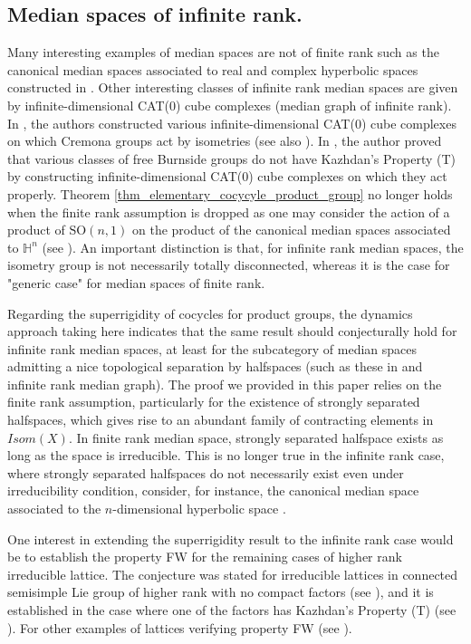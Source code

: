 \documentclass{amsart}
\numberwithin{equation}{section}
\theoremstyle{definition}
\begin{document}
\color{black}
\subsection{Median spaces of infinite rank.}
Many interesting examples of median spaces are not of finite rank such as the canonical median spaces associated to real and complex hyperbolic spaces constructed in \cite{ChaD_hyperbolic}. Other interesting classes of infinite rank median spaces are given by infinite-dimensional CAT(0) cube complexes (median graph of infinite rank). In \cite{LonjouUrech}, the authors constructed  various infinite-dimensional CAT(0) cube complexes on which Cremona groups act by isometries (see also \cite{Genevois-Lonjou-Urech}). In \cite{Osajda}, the author proved that various classes of free Burnside groups do not have Kazhdan's Property (T) by constructing infinite-dimensional CAT(0) cube complexes on which they act properly. Theorem \ref{thm_elementary_cocycyle_product_group} no longer holds when the finite rank assumption is dropped as one may consider the action of a product of $\mathrm{SO}(n,1)$ on the product of the canonical median spaces associated to $\mathbb{H}^n$ (see \cite{ChaD_hyperbolic}). An important distinction is that, for infinite rank median spaces, the isometry group is not necessarily totally disconnected, whereas it is the case for "generic case" for median spaces of finite rank.
\par 
\color{black}
Regarding the superrigidity of cocycles for product groups, the dynamics approach taking here indicates that the same result should conjecturally hold for infinite rank median spaces, at least for the subcategory of median spaces admitting a nice topological separation by halfspaces (such as these in \cite{ChaD_hyperbolic} and infinite rank median graph). The proof we provided in this paper relies on the finite rank assumption, particularly for the existence of strongly separated halfspaces, which gives rise to an abundant family of contracting elements in $Isom(X)$. In finite rank median space, strongly separated halfspace exists as long as the space is irreducible. This is no longer true in the infinite rank case, where strongly separated halfspaces do not necessarily exist even under irreducibility condition, consider, for instance, the canonical median space associated to the $n$-dimensional hyperbolic space \cite{ChaD_hyperbolic}.\par 

One interest in extending the superrigidity result to the infinite rank case would be to establish the property FW for the remaining cases of higher rank irreducible lattice. The conjecture was stated for irreducible lattices in connected semisimple Lie group of higher rank with no compact factors (see \cite[Conjecture 1.9]{Cornulier}), and it is established in the case where one of the factors has Kazhdan's Property (T) (see \cite[Theorem 1.12]{Cornulier}). For other examples of lattices verifying property FW (see \cite[section 1.2]{Cornulier-2}).
\end{document}
